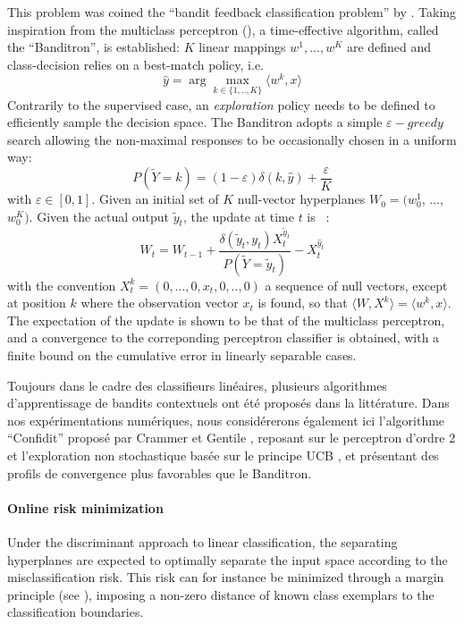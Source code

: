 \documentclass[preprint,12pt,authoryear]{elsarticle}
\begin{document}
This problem was coined the ``bandit feedback classification problem'' by \cite{kakade2008efficient}. Taking inspiration from the multiclass perceptron (\cite{duda1973pattern}), a time-effective algorithm, called the ``Banditron'', is established:
$K$ linear mappings $w^1, ..., w^K$ are defined and class-decision relies on a best-match policy, i.e.
 $$\hat{y} = \arg \max_{k \in\{1,..,K\}}  \langle w^k, x \rangle$$
Contrarily to the supervised case, an \textit{exploration} policy needs to be defined to efficiently sample the decision space. The Banditron adopts a simple  $\varepsilon-greedy$ search allowing the non-maximal responses to be occasionally chosen in a uniform way:
 $$P(\tilde{Y}=k) = (1-\varepsilon) \delta(k,\hat{y}) + \frac{\varepsilon}{K}$$ with $\varepsilon \in [0,1]$.
Given an initial set of $K$ null-vector hyperplanes $W_0 = (w^{1}_0$, ..., $w^{K}_0)$. Given the actual output $\tilde{y}_t$, the update at time $t$ is ~:
$$ W_t = W_{t-1} + \frac{\delta(\tilde{y}_t ,y_t) X_t^{\tilde{y}_t}}{P(\tilde{Y}=\tilde{y}_t)} - X_t^{\hat{y}_t}$$   
with the convention $X_t^k = (0, ..., 0,  x_t, 0, .., 0)$ a sequence of null vectors, except at position $k$ where the observation vector $x_t$ is found, so that $\langle W, X^k\rangle = \langle w^k, x\rangle$. The expectation of the update is shown to be that of the multiclass perceptron, and a convergence to the correponding perceptron classifier is obtained, with a finite bound on the cumulative error in linearly separable cases. 

{\color{blue}
Toujours dans le cadre des classifieurs linéaires, plusieurs algorithmes d'apprentissage de bandits contextuels ont été proposés dans la littérature. Dans nos expérimentations numériques, nous considérerons également ici l'algorithme ``Confidit'' proposé par Crammer et Gentile \cite{crammer2013multiclass}, reposant sur le perceptron d'ordre 2 et l'exploration non stochastique basée sur le principe UCB \cite{lai1985asymptotically}, et présentant des profils de convergence plus favorables que le Banditron. }


\paragraph{Online risk minimization}
Under the discriminant approach to linear classification, the separating hyperplanes are expected to optimally separate the input space according to the misclassification risk. This risk can for instance be minimized through a margin principle (see \cite{vapnik1998statistical}), imposing a non-zero distance of known class exemplars to the classification boundaries. 
\end{document}
